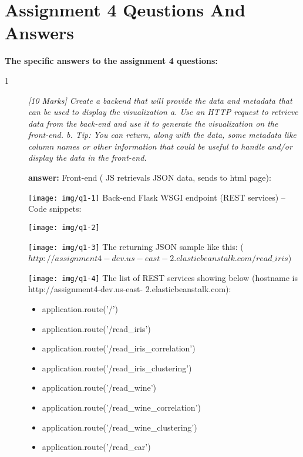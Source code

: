 \documentclass[]{report}
\begin{document}
\section{Assignment 4 Qeustions And Answers}
\textbf{The specific answers to the assignment 4 questions:}
\begin{description}
\item[1]
{\em [10 Marks] Create a backend that will provide the data and metadata that can be used to display the visualization
a.	Use an HTTP request to retrieve data from the back-end and use it to generate the visualization on the front-end.
b.	Tip: You can return, along with the data, some metadata like column names or other information that could be useful to handle and/or display the data in the front-end.}

\textbf{answer:}
Front-end ( JS retrievals JSON data, sends to html page):

\texttt{[image: img/q1-1]}
\bigbreak
Back-end Flask WSGI endpoint (REST services) – Code snippets:

\texttt{[image: img/q1-2]}

\texttt{[image: img/q1-3]}
\bigbreak
The returning JSON sample like this: ($http://assignment4-dev.us-east-2.elasticbeanstalk.com/read\_iris$)

\texttt{[image: img/q1-4]}
\bigbreak
The list of REST services showing below (hostname is http://assignment4-dev.us-east- 2.elasticbeanstalk.com):
\begin{itemize}
\item application.route('/')

\item application.route('/read\_iris')

\item application.route('/read\_iris\_correlation')

\item application.route('/read\_iris\_clustering')

\item application.route('/read\_wine')

\item application.route('/read\_wine\_correlation')

\item application.route('/read\_wine\_clustering')

\item application.route('/read\_car')


\end{itemize}
\end{description}
\end{document}
